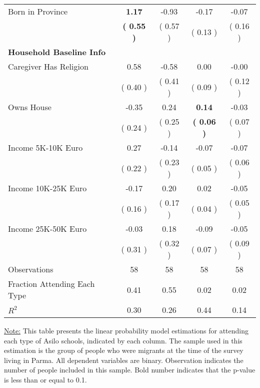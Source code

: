 \begin{table}[H]
{\begin{tabular}{lcccc}
\quad Born in Province & \textbf{     1.17} &     -0.93 &     -0.17 &     -0.07 \\
\quad  & \textbf{(     0.55 )} & (     0.57 )  & (     0.13 )  & (     0.16 )  \\
\midrule
\textbf{Household Baseline Info} \\
\quad Caregiver Has Religion &      0.58 &     -0.58 &      0.00 &     -0.00 \\
\quad  & (     0.40 ) & (     0.41 )  & (     0.09 )  & (     0.12 )  \\
\quad Owns House &     -0.35 &      0.24 & \textbf{     0.14} &     -0.03 \\
\quad  & (     0.24 ) & (     0.25 )  & \textbf{(     0.06 )}  & (     0.07 )  \\
\quad Income 5K-10K Euro &      0.27 &     -0.14 &     -0.07 &     -0.07 \\
\quad  & (     0.22 ) & (     0.23 )  & (     0.05 )  & (     0.06 )  \\
\quad Income 10K-25K Euro &     -0.17 &      0.20 &      0.02 &     -0.05 \\
\quad  & (     0.16 ) & (     0.17 )  & (     0.04 )  & (     0.05 )  \\
\quad Income 25K-50K Euro &     -0.03 &      0.18 &     -0.09 &     -0.05 \\
\quad  & (     0.31 ) & (     0.32 )  & (     0.07 )  & (     0.09 )  \\
\midrule
Observations & 58 & 58 & 58 & 58 \\
Fraction Attending Each Type &      0.41 &      0.55 &      0.02 &      0.02 \\
\midrule
$ R^2$ &      0.30 &      0.26 &      0.44 &      0.14 \\
\bottomrule
\end{tabular}}
\end{table}
\begin{footnotesize}
\noindent\underline{Note:} This table presents the linear probability model estimations for attending each type of Asilo schools, indicated by each column. The sample used in this estimation is the group of people who were migrants at the time of the survey living in Parma. All dependent variables are binary. Observation indicates the number of people included in this sample. Bold number indicates that the p-value is less than or equal to 0.1.
\end{footnotesize}
